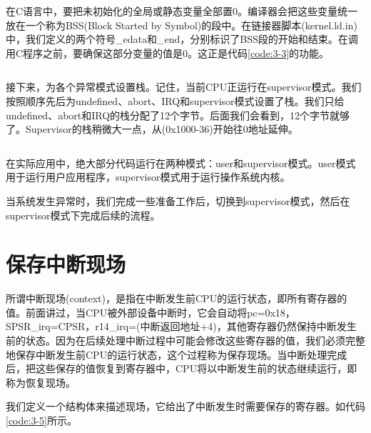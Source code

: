 \documentclass[main.tex]{subfiles}
\begin{document}
\begin{CJK*}{UTF8}{song}
\begin{code}
\label{code:3-2}
\inputminted[firstline=104,lastline=112,linenos,numbersep=5pt,frame=lines,framesep=2mm]{gas}{src/chapter03/kernel/entry.S}
\end{code}

在C语言中，要把未初始化的全局或静态变量全部置0。编译器会把这些变量统一放在一个称为BSS(Block Started by Symbol)的段中。在链接器脚本(kernel.ld.in)中，我们定义的两个符号\_edata和\_end，分别标识了BSS段的开始和结束。在调用C程序之前，要确保这部分变量的值是0。这正是代码\ref{code:3-3}的功能。

\begin{code}
\label{code:3-3}
\inputminted[firstline=112,lastline=121,linenos,numbersep=5pt,frame=lines,framesep=2mm]{gas}{src/chapter03/kernel/entry.S}
\end{code}

接下来，为各个异常模式设置栈。记住，当前CPU正运行在supervisor模式。我们按照顺序先后为undefined、abort、IRQ和supervisor模式设置了栈。我们只给undefined、abort和IRQ的栈分配了12个字节。后面我们会看到，12个字节就够了。Supervisor的栈稍微大一点，从(0x1000-36)开始往0地址延伸。
\begin{code}
\label{code:3-4}
\inputminted[firstline=121,lastline=143,linenos,numbersep=5pt,frame=lines,framesep=2mm]{gas}{src/chapter03/kernel/entry.S}
\end{code}

在实际应用中，绝大部分代码运行在两种模式：user和supervisor模式。user模式用于运行用户应用程序，supervisor模式用于运行操作系统内核。
\par
当系统发生异常时，我们完成一些准备工作后，切换到supervisor模式，然后在supervisor模式下完成后续的流程。

\section{保存中断现场}
所谓中断现场(context)，是指在中断发生前CPU的运行状态，即所有寄存器的值。前面讲过，当CPU被外部设备中断时，它会自动将pc=0x18，SPSR\_irq=CPSR，r14\_irq=(中断返回地址+4)，其他寄存器仍然保持中断发生前的状态。因为在后续处理中断过程中可能会修改这些寄存器的值，我们必须完整地保存中断发生前CPU的运行状态，这个过程称为保存现场。当中断处理完成后，把这些保存的值恢复到寄存器中，CPU将以中断发生前的状态继续运行，即称为恢复现场。

\par
我们定义一个结构体来描述现场，它给出了中断发生时需要保存的寄存器。如代码\ref{code:3-5}所示。


\end{CJK*}
\end{document}
